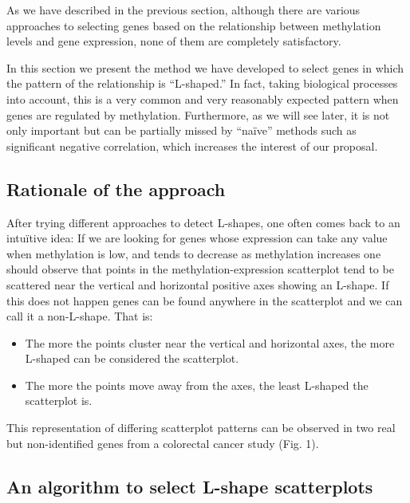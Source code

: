 \documentclass[10pt,letterpaper]{article}
\providecommand{\tightlist}{%
  \setlength{\itemsep}{0pt}\setlength{\parskip}{0pt}}
\begin{document}
As we have described in the previous section, although there are various
approaches to selecting genes based on the relationship between
methylation levels and gene expression, none of them are completely
satisfactory.

In this section we present the method we have developed to select genes
in which the pattern of the relationship is ``L-shaped.'' In fact,
taking biological processes into account, this is a very common and very
reasonably expected pattern when genes are regulated by methylation.
Furthermore, as we will see later, it is not only important but can be
partially missed by ``naïve'' methods such as significant negative
correlation, which increases the interest of our proposal.

\hypertarget{rationale-of-the-approach}{%
\subsection{Rationale of the approach}\label{rationale-of-the-approach}}

After trying different approaches to detect L-shapes, one often comes
back to an intuïtive idea: If we are looking for genes whose expression
can take any value when methylation is low, and tends to decrease as
methylation increases one should observe that points in the
methylation-expression scatterplot tend to be scattered near the
vertical and horizontal positive axes showing an L-shape. If this does
not happen genes can be found anywhere in the scatterplot and we can
call it a non-L-shape. That is:

\begin{itemize}
\tightlist
\item
  The more the points cluster near the vertical and horizontal axes, the
  more L-shaped can be considered the scatterplot.
\item
  The more the points move away from the axes, the least L-shaped the
  scatterplot is.
\end{itemize}

This representation of differing scatterplot patterns can be observed in
two real but non-identified genes from a colorectal cancer study (Fig.
1).

\hypertarget{an-algorithm-to-select-l-shape-scatterplots}{%
\subsection{An algorithm to select L-shape
scatterplots}\label{an-algorithm-to-select-l-shape-scatterplots}}
\end{document}
